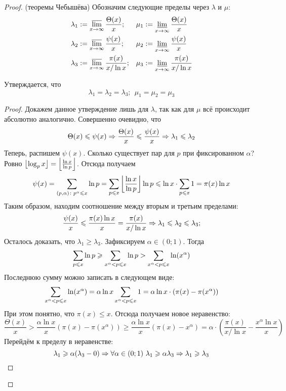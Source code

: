 \begin{proof} (теоремы Чебышёва)
	Обозначим следующие пределы через $\lambda$ и $\mu$:
	\begin{align*}
		&{\lambda_1 := \varlimsup\limits_{x \to \infty} \frac{\Theta(x)}{x};} & &{\mu_1 := \varliminf\limits_{x \to \infty} \frac{\Theta(x)}{x}} \\
		&{\lambda_2 := \varlimsup\limits_{x \to \infty} \frac{\psi(x)}{x};} & &{\mu_2 := \varliminf\limits_{x \to \infty} \frac{\psi(x)}{x}} \\
		&{\lambda_3 := \varlimsup\limits_{x \to \infty} \frac{\pi(x)}{x / \ln x};} & &{\mu_3 := \varliminf\limits_{x \to \infty} \frac{\pi(x)}{x / \ln x}}
	\end{align*}
	
	\begin{lemma}
		Утверждается, что
		\[
			\lambda_1 = \lambda_2 = \lambda_3;\ \ \mu_1 = \mu_2 = \mu_3
		\]
	\end{lemma}

	\begin{proof}
		Докажем данное утверждение лишь для $\lambda$, так как для $\mu$ всё происходит абсолютно аналогично. Совершенно очевидно, что
		\[
			\Theta(x) \leqslant \psi(x) \Rightarrow \frac{\Theta(x)}{x} \leqslant \frac{\psi(x)}{x} \Rightarrow \lambda_1 \leqslant \lambda_2
		\]
		Теперь, распишем $\psi(x)$. Сколько существует пар для $p$ при фиксированном $\alpha$? Ровно $\left\lfloor \log_p x \right\rfloor = \left\lfloor \frac{\ln x}{\ln p} \right\rfloor$. Отсюда получаем
		\[
			\psi(x) = \sum\limits_{(p, \alpha) \colon p^\alpha \leqslant x} \ln p = \sum\limits_{p \leqslant x} \left\lfloor \frac{\ln x}{\ln p} \right\rfloor \ln p \leqslant \ln x \cdot \sum\limits_{p \leqslant x} 1 = \pi(x) \ln x
		\]
		Таким образом, находим соотношение между вторым и третьим пределами:
		\[
		 	\frac{\psi(x)}{x} \leqslant \frac{\pi(x) \ln x}{x} = \frac{\pi(x)}{x / \ln x} \Rightarrow \lambda_1 \leqslant \lambda_2 \leqslant \lambda_3;
		\]
		Осталось доказать, что $\lambda_1 \ge \lambda_3$. Зафиксируем $\alpha \in (0; 1)$. Тогда
		\[
			\sum\limits_{p \leqslant x} \ln p \geqslant \sum\limits_{x^\alpha < p \leqslant x} \ln p > \sum\limits_{x^\alpha < p \leqslant x} \ln (x^\alpha)
		\]
		Последнюю сумму можно записать в следующем виде:
		\[
			\sum\limits_{x^\alpha < p \leqslant x} \ln (x^\alpha) = \alpha \ln x \sum\limits_{x^\alpha < p \leqslant x} 1 = \alpha \ln x \cdot (\pi(x) - \pi(x^\alpha))
		\]
		При этом понятно, что $\pi(x) \le x$. Отсюда получаем новое неравенство:
		\[
			\frac{\Theta(x)}{x} > \frac{\alpha \ln x}{x} (\pi(x) - \pi(x^\alpha)) \ge \frac{\alpha \ln x}{x}(\pi(x) - x^\alpha) = \alpha \cdot \left(\frac{\pi(x)}{x / \ln x} - \frac{x^\alpha \ln x}{x}\right)
		\]
		Перейдём к пределу в неравенстве:
		\[
			\lambda_1 \geqslant \alpha (\lambda_3 - 0) \Rightarrow \forall \alpha \in (0; 1)\ \lambda_1 \geqslant \alpha \lambda_3 \Rightarrow \lambda_1 \geqslant \lambda_3
		\]
	\end{proof}


\end{proof}
